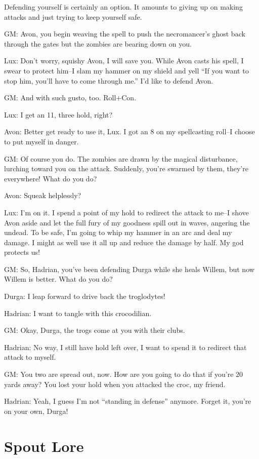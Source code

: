  Defending yourself is certainly an option. It amounts to giving up on making attacks and just trying to keep yourself safe.


 GM: Avon, you begin weaving the spell to push the necromancer's ghost back through the gates but the zombies are bearing down on you.


 Lux: Don't worry, squishy Avon, I will save you. While Avon casts his spell, I swear to protect him--I slam my hammer on my shield and yell ``If you want to stop him, you'll have to come through me.'' I'd like to defend Avon.


 GM: And with such gusto, too. Roll+Con.


 Lux: I get an 11, three hold, right?


 Avon: Better get ready to use it, Lux. I got an 8 on my spellcasting roll--I choose to put myself in danger.


 GM: Of course you do. The zombies are drawn by the magical disturbance, lurching toward you on the attack. Suddenly, you're swarmed by them, they're everywhere! What do you do?


 Avon: Squeak helplessly?


 Lux: I'm on it. I spend a point of my hold to redirect the attack to me--I shove Avon aside and let the full fury of my goodness spill out in waves, angering the undead. To be safe, I'm going to whip my hammer in an arc and deal my damage. I might as well use it all up and reduce the damage by half. My god protects us!


 GM: So, Hadrian, you've been defending Durga while she heals Willem, but now Willem is better. What do you do?


 Durga: I leap forward to drive back the troglodytes!


 Hadrian: I want to tangle with this crocodilian.


 GM: Okay, Durga, the trogs come at you with their clubs.


 Hadrian: No way, I still have hold left over, I want to spend it to redirect that attack to myself.


 GM: You two are spread out, now. How are you going to do that if you're 20 yards away? You lost your hold when you attacked the croc, my friend.


 Hadrian: Yeah, I guess I'm not ``standing in defense'' anymore. Forget it, you're on your own, Durga!
\section{Spout Lore}


